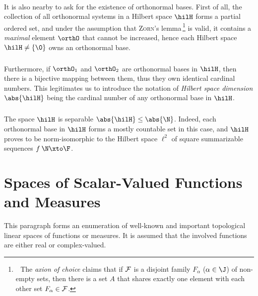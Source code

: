 \documentclass[11pt,twoside]{article}
\begin{document}
\begin{itemize}[leftmargin=12pt,itemsep=5pt]
\paragraph{} %
It is also nearby to ask for the existence of orthonormal bases.
First of all,
the collection of all orthonormal systems in a Hilbert space $\hilH$
forms a partial ordered set,
and under the assumption that \textsc{Zorn}{'s lemma}\,\footnote{\,
\,The \textit{axion of choice} claims that
if $\cal{F}$ is a disjoint family $F_{\alpha}$ ($\alpha \in \J$)
of non-empty sets,
then there is a set $A$ that shares exactly one element
with each other set $F_{\alpha} \in \cal{F}$.}
is valid,
it contains a \textit{maximal} element $\orthO$
that cannot be increased,
hence each Hilbert space $\hilH \neq \{\0\}$ owns an orthonormal base.

\subparagraph{} %
Furthermore,
if $\orthO_1$ and $\orthO_2$ are orthonormal bases in $\hilH$,
then there is a bijective mapping between them,
thus they own identical cardinal numbers.
This legitimates us to introduce the notation
of \textit{Hilbert space dimension} $\abs{\hilH} $
being the cardinal number of any orthonormal base in $\hilH$.

\subparagraph{} %
The space $\hilH$ is separable \iff $\abs{ \hilH} \leq \abs{\N} $.
Indeed,
each orthonormal base in $\hilH$ forms a mostly countable set in this case,
and $\hilH$ proves to be norm-isomorphic to the Hilbert space $\ell^2$
of square summarizable sequences $f\:\N \xto \F$.
\end{itemize}

\section{Spaces of Scalar-Valued Functions and Measures}
This paragraph forms an enumeration of well-known and important
topological linear spaces of functions or measures.
It is assumed that the involved functions are either real or complex-valued.
\end{document}
